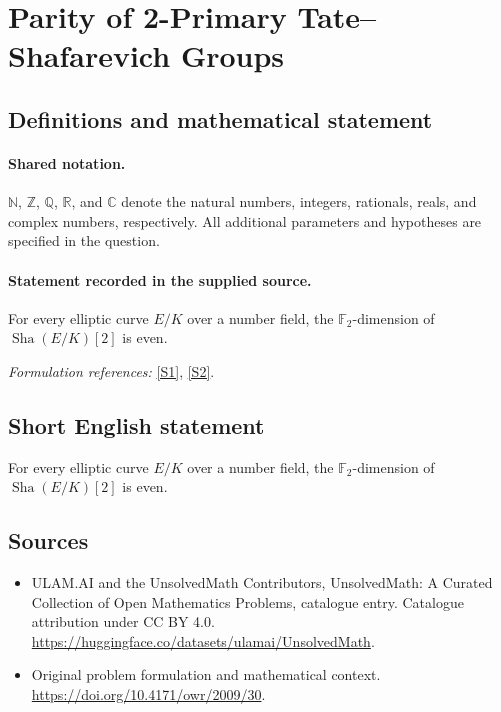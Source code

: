\documentclass[11pt]{article}
\newcommand{\sref}[2]{\hyperlink{source:#1:#2}{[S#2]}}
\begin{document}
\section{Parity of 2-Primary Tate–Shafarevich Groups}\label{statement}

\subsection{Definitions and mathematical statement}

\paragraph{Shared notation.}$\mathbb N$, $\mathbb Z$, $\mathbb Q$, $\mathbb R$, and $\mathbb C$ denote the natural numbers, integers, rationals, reals, and complex numbers, respectively. All additional parameters and hypotheses are specified in the question.


\paragraph{Statement recorded in the supplied source.}
For every elliptic curve $E/K$ over a number field, the $\mathbb{F}_2$-dimension of $\operatorname{Sha}(E/K)[2]$ is even.
\par\smallskip\textit{Formulation references:} \sref{statement}{1}, \sref{statement}{2}.
\subsection{Short English statement}
For every elliptic curve $E/K$ over a number field, the $\mathbb{F}_2$-dimension of $\operatorname{Sha}(E/K)[2]$ is even.
\subsection{Sources}
\begin{itemize}
\item[\hypertarget{source:statement:1}{S1}] ULAM.AI and the UnsolvedMath Contributors, UnsolvedMath: A Curated Collection of Open Mathematics Problems, catalogue entry. Catalogue attribution under CC BY 4.0.
\url{https://huggingface.co/datasets/ulamai/UnsolvedMath}.
\item[\hypertarget{source:statement:2}{S2}] Original problem formulation and mathematical context.
\url{https://doi.org/10.4171/owr/2009/30}.
\end{itemize}
\label{end:statement}
\end{document}

